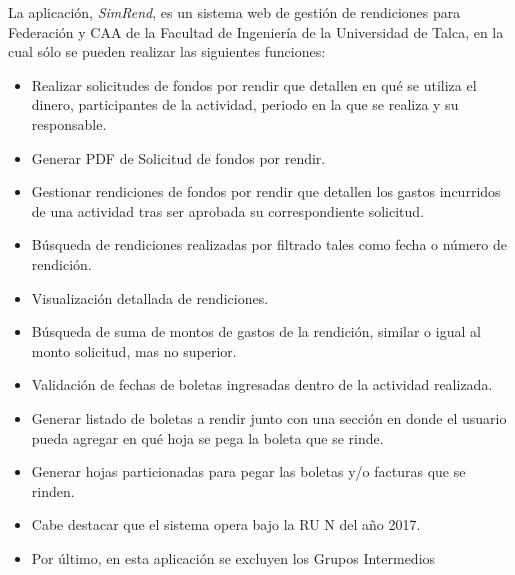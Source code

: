 La aplicación, \emph{SimRend}, es un sistema web de gestión de rendiciones para Federación y CAA de la Facultad de Ingeniería de la Universidad de Talca, en la cual sólo se pueden realizar las siguientes funciones:

\begin{itemize}
    \item Realizar solicitudes de fondos por rendir que detallen en qué se utiliza el dinero, participantes de la actividad, periodo en la que se realiza y su responsable.
    
    \item Generar PDF de Solicitud de fondos por rendir.

    \item Gestionar rendiciones de fondos por rendir que detallen los gastos incurridos de una actividad tras ser aprobada su correspondiente solicitud.
    
    \item Búsqueda de rendiciones realizadas por filtrado tales como fecha o número de rendición.
    
    \item Visualización detallada de rendiciones.
    
    \item Búsqueda de suma de montos de gastos de la rendición, similar o igual al monto solicitud, mas no superior.
    
    \item Validación de fechas de boletas ingresadas dentro de la actividad realizada.
    
    \item Generar listado de boletas a rendir junto con una sección en donde el usuario pueda agregar en qué hoja se pega la boleta que se rinde.
    
    \item Generar hojas particionadas para pegar las boletas y/o facturas que se rinden.
    
    \item Cabe destacar que el sistema opera bajo la RU N del año 2017.
    
    \item Por último, en esta aplicación se excluyen los Grupos Intermedios
\end{itemize}